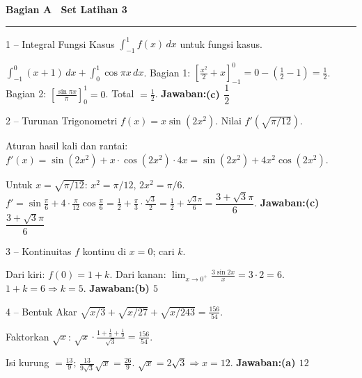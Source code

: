 \documentclass[11pt]{article}
\newcommand{\jawaban}[1]{\textbf{Jawaban:}\enspace\colorbox{gold!30}{\textbf{#1}}}
\begin{document}
\clearpage

{\noindent\large\bfseries Bagian A \textendash\ Set Latihan 3\par}\smallskip\hrule\medskip

\begin{soal}{1 -- Integral Fungsi Kasus}
$\int_{-1}^1 f(x)\,dx$ untuk fungsi kasus.
\end{soal}
\begin{pembox}
$\int_{-1}^0(x+1)\,dx+\int_0^1\cos\pi x\,dx$.
Bagian 1: $\left[\frac{x^2}{2}+x\right]_{-1}^0=0-(\frac12-1)=\frac12$.
Bagian 2: $\left[\frac{\sin\pi x}{\pi}\right]_0^1=0$.
Total $=\frac12$.
\jawaban{(c) $\dfrac12$}
\end{pembox}

\begin{soal}{2 -- Turunan Trigonometri}
$f(x)=x\sin(2x^2)$. Nilai $f'\!\left(\sqrt{\pi/12}\right)$.
\end{soal}
\begin{pembox}
Aturan hasil kali dan rantai: $f'(x)=\sin(2x^2)+x\cdot\cos(2x^2)\cdot4x=\sin(2x^2)+4x^2\cos(2x^2)$.

Untuk $x=\sqrt{\pi/12}$: $x^2=\pi/12$, $2x^2=\pi/6$.
$f'=\sin\frac\pi6+4\cdot\frac\pi{12}\cos\frac\pi6=\frac12+\frac\pi3\cdot\frac{\sqrt3}{2}=\frac12+\frac{\sqrt3\pi}{6}=\dfrac{3+\sqrt3\pi}{6}$.
\jawaban{(c) $\dfrac{3+\sqrt3\pi}{6}$}
\end{pembox}

\begin{soal}{3 -- Kontinuitas}
$f$ kontinu di $x=0$; cari $k$.
\end{soal}
\begin{pembox}
Dari kiri: $f(0)=1+k$. Dari kanan: $\lim_{x\to0^+}\frac{3\sin2x}{x}=3\cdot2=6$.
$1+k=6\Rightarrow k=5$.
\jawaban{(b) $5$}
\end{pembox}

\begin{soal}{4 -- Bentuk Akar}
$\sqrt{x/3}+\sqrt{x/27}+\sqrt{x/243}=\frac{156}{54}$.
\end{soal}
\begin{pembox}
Faktorkan $\sqrt x$: $\sqrt x\cdot\frac{1+\frac13+\frac19}{\sqrt3}=\frac{156}{54}$.

Isi kurung $=\frac{13}{9}$; $\frac{13}{9\sqrt3}\sqrt x=\frac{26}{9}$. $\sqrt x=2\sqrt3\Rightarrow x=12$.
\jawaban{(a) $12$}
\end{pembox}
\end{document}
